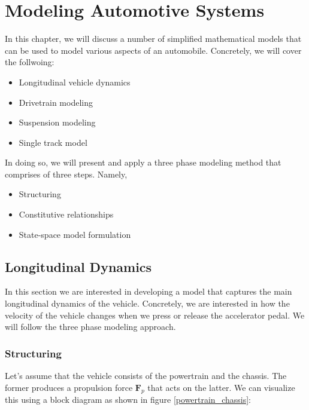 \chapter{Modeling Automotive Systems}
\label{model_automotive_sys}
In this chapter, we will discuss a number of simplified mathematical models that can be used to model various aspects
of an automobile. Concretely, we will cover the follwoing:

\begin{itemize}
\item Longitudinal vehicle dynamics
\item Drivetrain modeling
\item Suspension modeling
\item Single track model
\end{itemize}

In doing so, we will present and apply a three phase modeling method that comprises of three steps. Namely,

\begin{itemize}
\item Structuring
\item Constitutive relationships
\item State-space model formulation
\end{itemize}
 

\section{Longitudinal Dynamics}
\label{longitudinal_dynamics}
In this section we are interested in developing a model that captures the main longitudinal dynamics of the vehicle. Concretely, we are interested in
how the velocity of the vehicle changes when we press or release the accelerator pedal. We will follow the three phase modeling approach. 

\subsection{Structuring}
Let's assume that the vehicle consists of the powertrain and the chassis. The former produces a propulsion force $\mathbf{F}_p$ that acts on the latter. We can visualize this 
using a block diagram as shown in figure \ref{powertrain_chassis}:

